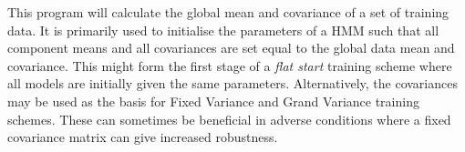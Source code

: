 %
%


\newpage
{}


This program will calculate the global mean and covariance
of a set of training data.  It is primarily used to initialise
the parameters of a HMM such that all component means and all covariances
are set equal to the global data mean and covariance.  This might form
the first stage of a \textit{flat start} training scheme 
where all models are initially given the same parameters.  
Alternatively, the covariances may be used as the basis for Fixed
Variance and Grand Variance training schemes.  These can sometimes be
beneficial in adverse conditions where a fixed covariance matrix can
give increased robustness.

